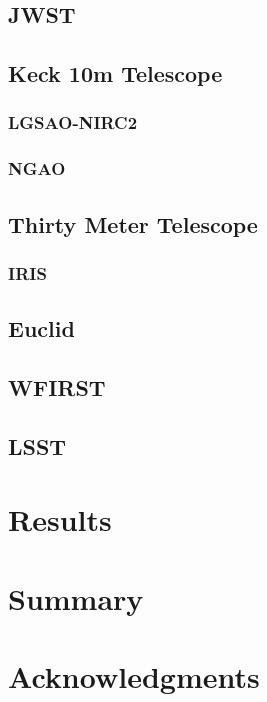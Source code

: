\documentclass[a4paper,11pt]{article}
\begin{document}
\subsection{JWST}
\subsection{Keck 10m Telescope}
\subsubsection{LGSAO-NIRC2}
\subsubsection{NGAO}
\subsection{Thirty Meter Telescope}
\subsubsection{IRIS}
\subsection{Euclid}
\subsection{WFIRST}
\subsection{LSST}

\section{Results}

\section{Summary}

\section*{Acknowledgments}









\end{document}
